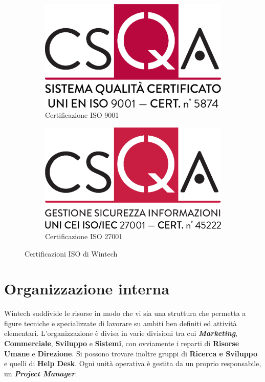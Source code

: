 \begin{figure}[htbp]
    \centering
    \begin{subfigure}[b]{0.4\linewidth}
        \centering
        \includegraphics[width=0.8\linewidth]{images/wtc/ISO-9001.png}
        \caption{Certificazione ISO 9001}
        \label{fig:iso-9001}
    \end{subfigure}
    \hfill
    \begin{subfigure}[b]{0.4\linewidth}
        \centering
        \includegraphics[width=0.8\linewidth]{images/wtc/ISO-27001.png}
        \caption{Certificazione ISO 27001}
        \label{fig:iso-27001}
    \end{subfigure}
    \caption{Certificazioni ISO di Wintech}
    \label{fig:iso-wtc}
\end{figure}

\section{Organizzazione interna}

Wintech suddivide le risorse in modo che vi sia una struttura che permetta a figure tecniche e specializzate di lavorare su ambiti ben definiti ed attività elementari. L'organizzazione è divisa in varie divisioni tra cui \textbf{\emph{Marketing}}, \textbf{Commerciale}, \textbf{Sviluppo} e \textbf{Sistemi}, con ovviamente i reparti di \textbf{Risorse Umane} e \textbf{Direzione}. Si possono trovare inoltre gruppi di \textbf{Ricerca e Sviluppo} e quelli di \textbf{Help Desk}. Ogni unità operativa è gestita da un proprio responsabile, un \textbf{\emph{Project Manager}}.

